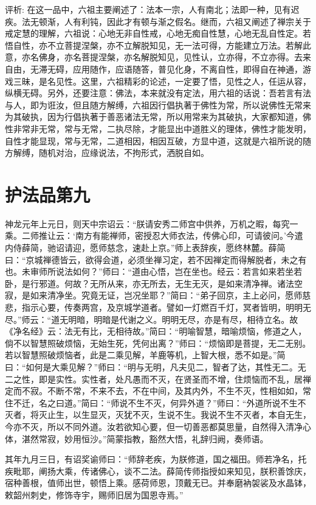\documentclass[12pt,twoside,openany]{book}
\newcommand{\kai}[1]{{\CJKfamily{kai}#1}}
\begin{document}
\kai{评析: 在这一品中，六祖主要阐述了：法本一宗，人有南北；法即一种，见有迟疾。法无顿渐，人有利钝，因此才有顿与渐之假名。继而，六祖又阐述了禅宗关于戒定慧的理解，六祖说：心地无非自性戒，心地无痴自性慧，心地无乱自性定。若悟自性，亦不立菩提涅槃，亦不立解脱知见，无一法可得，方能建立万法。若解此意，亦名佛身，亦名菩提涅槃，亦名解脱知见，见性认，立亦得，不立亦得。去来自由，无滞无碍，应用随作，应语随答，普见化身，不离自性，即得自在神通，游戏三昧，是名见性。这里，六祖精彩的论述，一定要了悟，见性之人，任运从容，纵横无碍。另外，还要注意：佛法，本来就没有定法，用六祖的话说：吾若言有法与人，即为诳汝，但且随方解缚，六祖因行倡执著于佛性为常，所以说佛性无常来为其破执，因为行倡执著于善恶诸法无常，所以用常来为其破执，大家都知道，佛性非常非无常，常与无常，二执尽除，才能显出中道胜义的理体，佛性才能发明，自性才能显现，常与无常，二道相因，相因互破，方显中道，这就是六祖所说的随方解缚，随机对治，应缘说法，不拘形式，洒脱自如。}

\chapter{护法品第九}
神龙元年上元日，则天中宗诏云：“朕请安秀二师宫中供养，万机之暇，每究一乘。二师推让云：‘南方有能禅师，密授忍大师衣法，传佛心印，可请彼问。’今遣内侍薛简，驰诏请迎，愿师慈念，速赴上京。”师上表辞疾，愿终林麓。薛简曰：“京城禅德皆云，欲得会道，必须坐禅习定，若不因禅定而得解脱者，未之有也。未审师所说法如何？”师曰：“道由心悟，岂在坐也。经云：若言如来若坐若卧，是行邪道。何故？无所从来，亦无所去，无生无灭，是如来清净禅。诸法空寂，是如来清净坐。究竟无证，岂况坐耶？”简曰：“弟子回京，主上必问，愿师慈悲，指示心要，传奏两宫，及京城学道者。譬如一灯燃百千灯，冥者皆明，明明无尽。”师云：“道无明暗，明暗是代谢之义。明明无尽，亦是有尽，相待立名。故《净名经》云：法无有比，无相待故。”简曰：“明喻智慧，暗喻烦恼，修道之人，倘不以智慧照破烦恼，无始生死，凭何出离？”师曰：“烦恼即是菩提，无二无别。若以智慧照破烦恼者，此是二乘见解，羊鹿等机，上智大根，悉不如是。”简曰：“如何是大乘见解？”师曰：“明与无明，凡夫见二，智者了达，其性无二。无二之性，即是实性。实性者，处凡愚而不灭，在贤圣而不增，住烦恼而不乱，居禅定而不寂。不断不常，不来不去，不在中间，及其内外，不生不灭，性相如如，常住不迁，名之曰道。”简曰：“师说不生不灭，何异外道？”师曰：“外道所说不生不灭者，将灭止生，以生显灭，灭犹不灭，生说不生。我说不生不灭者，本自无生，今亦不灭，所以不同外道。汝若欲知心要，但一切善恶都莫思量，自然得入清净心体，湛然常寂，妙用恒沙。”简蒙指教，豁然大悟，礼辞归阙，奏师语。

其年九月三日，有诏奖谕师曰：“师辞老疾，为朕修道，国之福田。师若净名，托疾毗耶，阐扬大乘，传诸佛心，谈不二法。薛简传师指授如来知见，朕积善馀庆，宿种善根，值师出世，顿悟上乘。感荷师恩，顶戴无已。并奉磨衲袈裟及水晶钵，敕韶州刺史，修饰寺宇，赐师旧居为国恩寺焉。”
\end{document}
